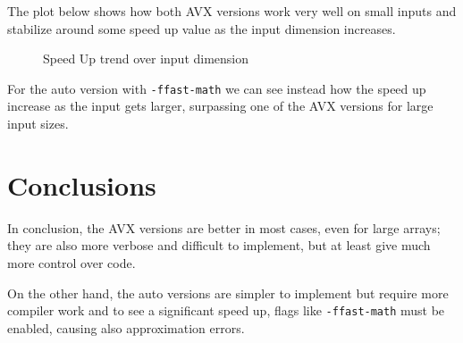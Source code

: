 \documentclass[12pt, a4paper]{article}
\begin{document}
The plot below shows how both AVX versions work very well on small inputs and
stabilize around some speed up value as the input dimension increases.

\begin{figure}[H]
	\centering
	
	\caption{Speed Up trend over input dimension}
\end{figure}

For the auto version with \verb|-ffast-math| we can see instead how the speed
up increase as the input gets larger, surpassing one of the AVX versions for
large input sizes.

\section{Conclusions}

In conclusion, the AVX versions are better in most cases, even for large arrays;
they are also more verbose and difficult to implement, but at least give much
more control over code.

On the other hand, the auto versions are simpler to implement but require more
compiler work and to see a significant speed up, flags like \verb|-ffast-math|
must be enabled, causing also approximation errors.
\end{document}
